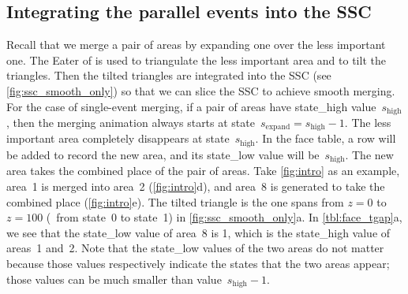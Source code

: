 \documentclass[ijgi,article,submit,moreauthors,pdftex]{Definitions/mdpi}
\begin{document}
\subsection{Integrating the parallel events into the SSC}
\label{sec:integrate_ssc}

Recall that we merge a pair of areas by expanding one over 
the less important one.
The Eater of \citet{Suba2014Merge} is used to 
triangulate the less important area and to tilt the triangles.
Then the tilted triangles are integrated into the SSC
(see \fig\ref{fig:ssc_smooth_only})
so that we can slice the SSC to achieve smooth merging.
For the case of single-event merging,
if a pair of areas have state\_high value~$s_\mathrm{high}$,
then the merging animation 
always starts at state~$s_\mathrm{expand}=s_\mathrm{high}-1$.
The less important area completely disappears
at state~$s_\mathrm{high}$.
In the face table, a row will be added 
to record the new area, and its state\_low value will be~$s_\mathrm{high}$.
The new area takes the combined place of the pair of areas.
Take \ref{fig:intro} as an example, 
area~1 is merged into area~2 (\figs\ref{fig:intro}d), 
and area~8 is generated to take the combined place (\figs\ref{fig:intro}e).
The tilted triangle is the one spans 
from $z= 0$ to $z=100$ (\ie~from state~0 to state~1)
in \fig\ref{fig:ssc_smooth_only}a.
In \tbl\ref{tbl:face_tgap}a, we see that
the state\_low value of area~8 is 1,
which is the state\_high value of areas~1 and~2.
Note that the state\_low values of the two areas do not matter 
because those values respectively indicate the states that
the two areas appear;
those values can be much smaller 
than value~$s_\mathrm{high}-1$.
\end{document}
